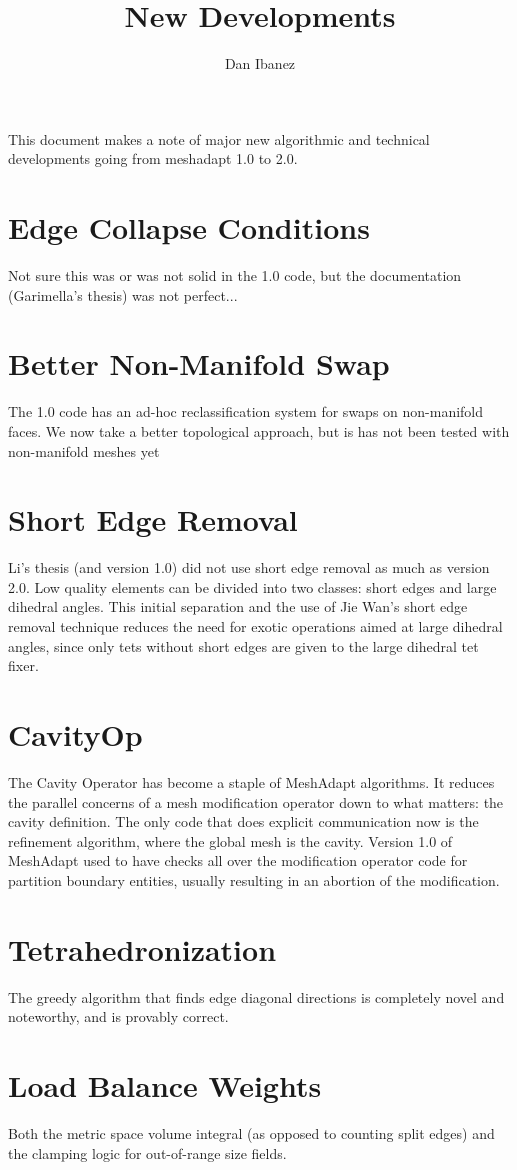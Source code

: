 \documentclass{article}
\title{New Developments}
\author{Dan Ibanez}
\begin{document}
\maketitle
This document makes a note of major new algorithmic and technical
developments going from meshadapt 1.0 to 2.0.

\section{Edge Collapse Conditions}
Not sure this was or was not solid in the 1.0 code, but
the documentation (Garimella's thesis) was not perfect...
\section{Better Non-Manifold Swap}
The 1.0 code has an ad-hoc reclassification system for
swaps on non-manifold faces.
We now take a better topological approach, but is has not
been tested with non-manifold meshes yet
\section{Short Edge Removal}
Li's thesis (and version 1.0) did not use short edge removal
as much as version 2.0.
Low quality elements can be divided into two classes:
short edges and large dihedral angles.
This initial separation and the use of Jie Wan's short
edge removal technique reduces the need for exotic operations
aimed at large dihedral angles,
since only tets without short edges are given to the large
dihedral tet fixer.
\section{CavityOp}
The Cavity Operator has become a staple of MeshAdapt algorithms.
It reduces the parallel concerns of a mesh modification operator
down to what matters: the cavity definition.
The only code that does explicit communication now is the
refinement algorithm, where the global mesh is the cavity.
Version 1.0 of MeshAdapt used to have checks all over the modification
operator code for partition boundary entities, usually resulting
in an abortion of the modification.
\section{Tetrahedronization}
The greedy algorithm that finds edge diagonal directions is completely
novel and noteworthy, and is provably correct.
\section{Load Balance Weights}
Both the metric space volume integral (as opposed to counting split edges)
and the clamping logic for out-of-range size fields.
\end{document}
